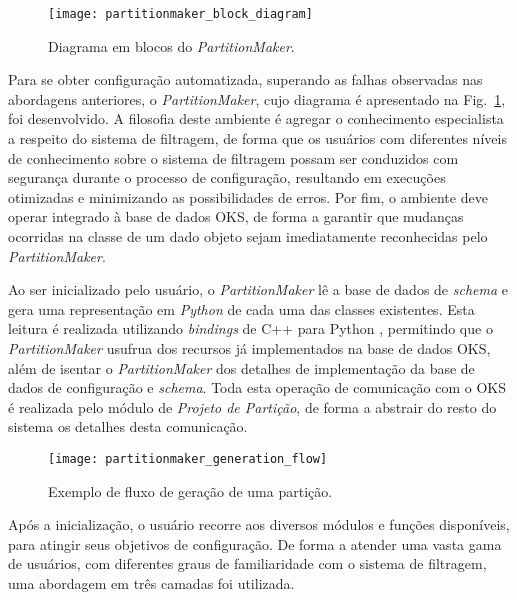 \begin{figure}
\begin{center}
\texttt{[image: partitionmaker\_block\_diagram]}
\caption{Diagrama em blocos do \emph{PartitionMaker}.}
\label{fig:pm}
\end{center}
\end{figure}

Para se obter configuração automatizada, superando as falhas observadas nas abordagens anteriores, o \emph{PartitionMaker}, cujo diagrama é apresentado na Fig.~\ref{fig:pm}, foi desenvolvido. A filosofia deste ambiente é agregar o conhecimento especialista a respeito do sistema de filtragem, de forma que os usuários com diferentes níveis de conhecimento sobre o sistema de filtragem possam ser conduzidos com segurança durante o processo de configuração, resultando em execuções otimizadas e minimizando as possibilidades de erros. Por fim, o ambiente deve operar integrado à base de dados OKS, de forma a garantir que mudanças ocorridas na classe de um dado objeto sejam imediatamente reconhecidas pelo \emph{PartitionMaker}.

Ao ser inicializado pelo usuário, o \emph{PartitionMaker} lê a base de dados de \emph{schema} e gera uma representação em \emph{Python} \cite{bib:python} de cada uma das classes existentes. Esta leitura é realizada utilizando \emph{bindings} de C++ para Python \cite{bib:boost}, permitindo que o \emph{PartitionMaker} usufrua dos recursos já implementados na base de dados OKS, além de isentar o \emph{PartitionMaker} dos detalhes de implementação da base de dados de configuração e \emph{schema}. Toda esta operação de comunicação com o OKS é realizada pelo módulo de  \emph{Projeto de Partição}, de forma a abstrair do resto do sistema os detalhes desta comunicação.

\begin{figure}[t]
\begin{center}
\texttt{[image: partitionmaker\_generation\_flow]}
\caption{Exemplo de fluxo de geração de uma partição.}
\label{fig:pm_flow}
\end{center}
\end{figure}

Após a inicialização, o usuário recorre aos diversos módulos e funções disponíveis, para atingir seus objetivos de configuração. De forma a atender uma vasta gama de usuários, com diferentes graus de familiaridade com o sistema de filtragem, uma abordagem em três camadas foi utilizada.

